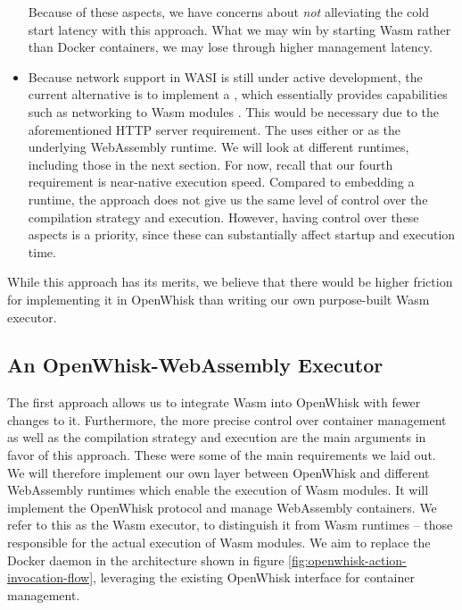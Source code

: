 \begin{itemize}
    Because of these aspects, we have concerns about \emph{not} alleviating the cold start latency with this approach. What we may win by starting Wasm rather than Docker containers, we may lose through higher management latency.
    \item Because network support in WASI is still under active development, the current alternative is to implement a , which essentially provides capabilities such as networking to Wasm modules \cite{WC2021}. This would be necessary due to the aforementioned HTTP server requirement. The  uses either  or  as the underlying WebAssembly runtime. We will look at different runtimes, including those in the next section. For now, recall that our fourth requirement is near-native execution speed. Compared to embedding a runtime, the  approach does not give us the same level of control over the compilation strategy and execution. However, having control over these aspects is a priority, since these can substantially affect startup and execution time.
\end{itemize}

While this approach has its merits, we believe that there would be higher friction for implementing it in OpenWhisk than writing our own purpose-built Wasm executor.

\subsection{An OpenWhisk-WebAssembly Executor}


The first approach allows us to integrate Wasm into OpenWhisk with fewer changes to it. Furthermore, the more precise control over container management as well as the compilation strategy and execution are the main arguments in favor of this approach. These were some of the main requirements we laid out. We will therefore implement our own layer between OpenWhisk and different WebAssembly runtimes which enable the execution of Wasm modules. It will implement the OpenWhisk protocol and manage WebAssembly containers. We refer to this as the Wasm executor, to distinguish it from Wasm runtimes -- those responsible for the actual execution of Wasm modules. We aim to replace the Docker daemon in the architecture shown in figure \ref{fig:openwhisk-action-invocation-flow}, leveraging the existing OpenWhisk interface for container management.

